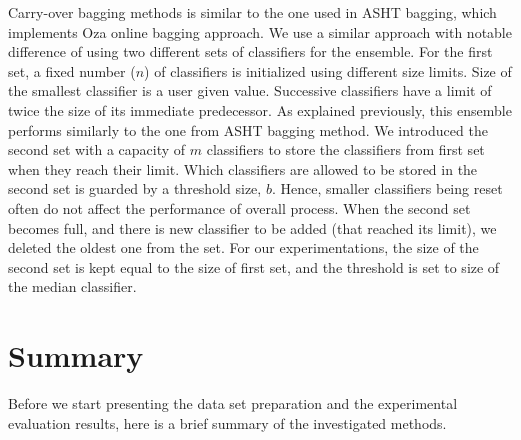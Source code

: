 Carry-over bagging methods is similar to the one used in ASHT bagging, which implements Oza online bagging approach. We use a similar approach with notable difference of using two different sets of classifiers for the ensemble. For the first set, a fixed number ($n$) of classifiers is initialized using different  size limits. Size of the smallest classifier is a user given value. Successive classifiers have a limit of twice the size of its immediate predecessor. As explained previously, this ensemble performs similarly to the one from ASHT bagging method. We introduced the second set with a capacity of $m$ classifiers to store the classifiers from first set when they reach their limit. Which classifiers are allowed to be stored in the second set is guarded by a threshold size, $b$. Hence, smaller classifiers being reset often do not affect the performance of overall process. When the second set becomes full, and there is new classifier to be added (that reached its limit), we deleted the oldest one from the set. For our experimentations, the size of the second set is kept equal to the size of first set, and the threshold is set to size of the median classifier. 


\section{Summary}
Before we start presenting the data set preparation and the experimental evaluation results, here is a brief summary of the investigated methods.

